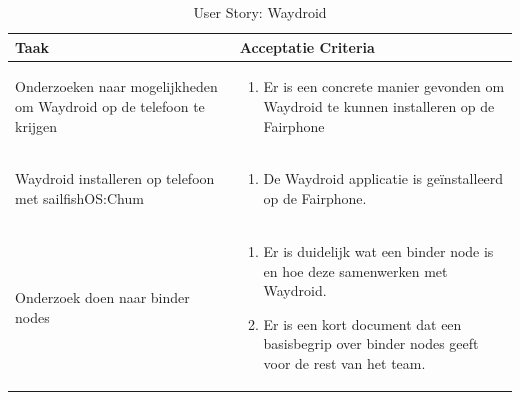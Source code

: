 \documentclass[a4paper]{report}
\newcommand{\userstorycolor}{PeachPuff1}
\begin{document}
\begin{tcolorbox}[colback=white, coltitle=black, colframe=\userstorycolor, title=\textbf{User Story: }Als developer wil ik Waydroid als package kunnen bouwen\, zodat er android apps op de telefoon gerund kunnen worden.]
\begin{table}[H]
    \centering
  \begin{tabularx}{1\textwidth}{|X|X|}
    \hline
    \cellcolor[HTML]{ffcc99} \textbf{Taak} & \cellcolor[HTML]{ffcc99} \textbf{Acceptatie Criteria} \\ 
    \hline
    Onderzoeken naar mogelijkheden om Waydroid op de telefoon te krijgen & 
      \begin{enumerate}[leftmargin=.4cm, topsep=0cm, itemsep=.2cm]
        \item Er is een concrete manier gevonden om Waydroid te kunnen installeren op de Fairphone
      \end{enumerate}
    \\
    \hline
    Waydroid installeren op telefoon met sailfishOS:Chum & 
      \begin{enumerate}[leftmargin=.4cm, topsep=0cm, itemsep=.2cm]
        \item De Waydroid applicatie is geïnstalleerd op de Fairphone.
      \end{enumerate}
    \\
    \hline
    Onderzoek doen naar binder nodes & 
      \begin{enumerate}[leftmargin=.4cm, topsep=0cm, itemsep=.2cm]
        \item Er is duidelijk wat een binder node is en hoe deze samenwerken met Waydroid. 
        \item Er is een kort document dat een basisbegrip over binder nodes geeft voor de rest van het team.
      \end{enumerate}
    \\
    \hline
    
  \end{tabularx}
  \caption{User Story: Waydroid}
\label{table:it5:story_waydroid}
\end{table}
\end{tcolorbox}
\end{document}
